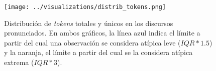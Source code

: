 \begin{figure}[h!]%
    \centering%
    \texttt{[image: ../visualizations/distrib\_tokens.png]}%
    \caption{Distribución de \textit{tokens} totales y únicos en los discursos pronunciados. En ambos gráficos,
    la línea azul indica el límite a partir del cual una observación se considera atípica leve
    ($IQR*1.5$) y la naranja, el límite a partir del cual se la considera atípica extrema ($IQR*3$).}%
    \label{fig-distrib-tokens}%
\end{figure}%


